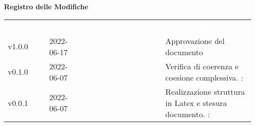 

{\LARGE{\textbf{Registro delle Modifiche}}} \\
\begin{table}[!htbp]
	\renewcommand{\arraystretch}{1.5}
	\begin{tabular}{ m{}<{\centering}  m{}<{\centering}  m{}<{\centering}  m{}<{\centering}  m{}<{\centering} }
		\rowcolor{darkblue}
		\textcolor{white}{\textbf{Versione}} & \textcolor{white}{\textbf{Data}} & \textcolor{white}{\textbf{Nominativo}} & \textcolor{white}{\textbf{Ruolo}} & \textcolor{white}{\textbf{Descrizione}}                              \\
		v1.0.0                               & 2022-06-17                  & \MG                                       & \RE                               & Approvazione del documento                                           \\

		v0.1.0                               & 2022-06-07                      & \PV                                    & \AN                               & Verifica di coerenza e coesione complessiva. \VE: \textit{\GC}          \\

		v0.0.1                               & 2022-06-07                       & \PV                                    & \AN                               & Realizzazione struttura in Latex e stesura documento. \VE: \textit{\GC} \\
	\end{tabular}
\end{table}

\pagebreak